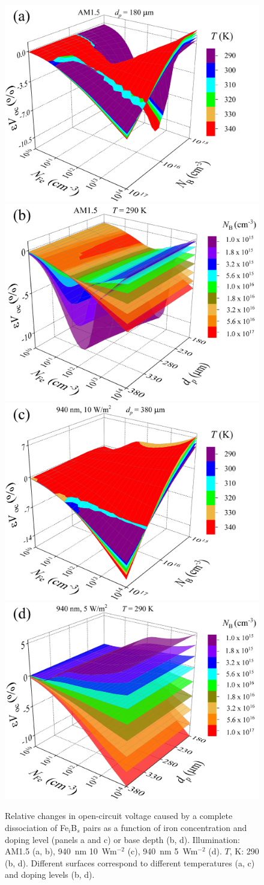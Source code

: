 \documentclass[a4paper,fleqn]{cas-sc}
\begin{document}
\begin{figure}
	\centering
     \includegraphics[width=0.49\linewidth]{Fig6a.png}
     \includegraphics[width=0.49\linewidth]{Fig6b.png}
     \includegraphics[width=0.49\linewidth]{Fig6c.png}
     \includegraphics[width=0.49\linewidth]{Fig6d.png}
	  \caption{Relative changes in open-circuit voltage caused by a complete
       dissociation of Fe$_i$B$_s$ pairs as a function of
       iron concentration and
       doping level (panels a and c) or base depth (b, d).
       Illumination: AM1.5 (a, b), 940~nm 10~Wm$^{-2}$ (c),  940~nm 5~Wm$^{-2}$ (d).
       $T$, K: 290 (b, d).
       Different surfaces correspond to different temperatures (a, c) and doping levels (b, d).
}\label{fig6}
\end{figure}
\end{document}
